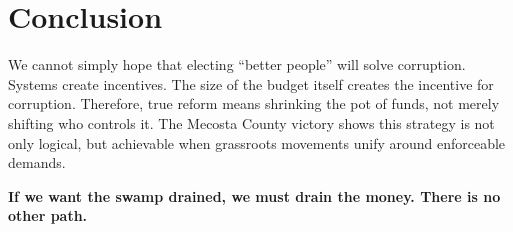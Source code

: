 \section{Conclusion}

We cannot simply hope that electing ``better people'' will solve corruption. Systems create incentives. The size of the budget itself creates the incentive for corruption. Therefore, true reform means shrinking the pot of funds, not merely shifting who controls it. The Mecosta County victory shows this strategy is not only logical, but achievable when grassroots movements unify around enforceable demands.


\textbf{If we want the swamp drained, we must drain the money. There is no other path.}